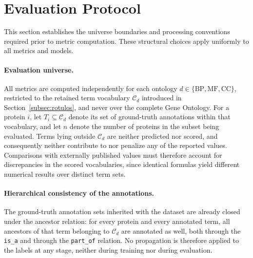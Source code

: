 \documentclass[Ingles]{ic-tese-v3}
\begin{document}
\section{Evaluation Protocol}
\label{sec:protocolo}

This section establishes the universe boundaries and processing conventions required
prior to metric computation. These structural choices apply uniformly to all metrics
and models.

\paragraph{Evaluation universe.}
All metrics are computed independently for each ontology $d \in \{\mathrm{BP},
\mathrm{MF}, \mathrm{CC}\}$, restricted to the retained term vocabulary
$\mathcal{C}_d$ introduced in Section~\ref{subsec:rotulos}, and never over the
complete Gene Ontology. For a protein $i$, let $T_i \subseteq \mathcal{C}_d$
denote its set of ground-truth annotations within that vocabulary, and let $n$
denote the number of proteins in the subset being evaluated. Terms lying
outside $\mathcal{C}_d$ are neither predicted nor scored, and consequently
neither contribute to nor penalize any of the reported values. Comparisons with
externally published values must therefore account for discrepancies in the
scored vocabularies, since identical formulas yield different numerical results
over distinct term sets.

\paragraph{Hierarchical consistency of the annotations.}
The ground-truth annotation sets inherited with the dataset are already closed
under the ancestor relation: for every protein and every annotated term, all
ancestors of that term belonging to $\mathcal{C}_d$ are annotated as well, both
through the \texttt{is\_a} and through the \texttt{part\_of} relation. No
propagation is therefore applied to the labels at any stage, neither during
training nor during evaluation.
\end{document}
